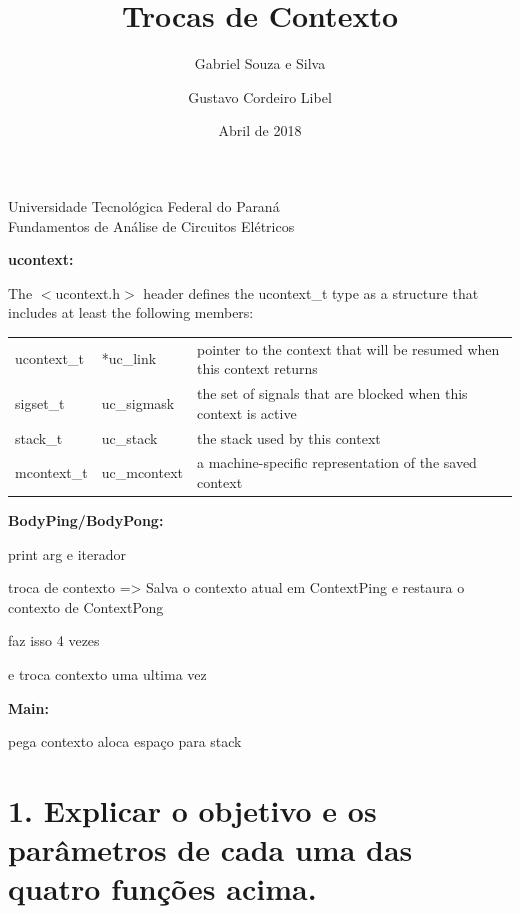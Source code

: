 \documentclass[12pt]{article}
\title{Trocas de Contexto} %
\author{Gabriel Souza e Silva \and Gustavo Cordeiro Libel} %
\date{Abril de 2018} %
\begin{document}
\maketitle %
\begin{center}
	Universidade Tecnológica Federal do Paraná\\
	Fundamentos de Análise de Circuitos Elétricos
\end{center}


\textbf{\large ucontext:}

The $<$ucontext.h$>$ header defines the ucontext\_t type as a structure that includes at least the following members:

\begin{table}[H]
	\centering
	\label{my-label}
	\begin{tabular}{|l|l|l|}
		\hline 
		ucontext\_t & *uc\_link    & pointer to the context that will be resumed when this context returns \\
		sigset\_t   & uc\_sigmask  & the set of signals that are blocked when this context is active       \\
		stack\_t    & uc\_stack    & the stack used by this context                                        \\
		mcontext\_t & uc\_mcontext & a machine-specific representation of the saved context          \\
		\hline      
	\end{tabular}
\end{table}


\textbf{\large BodyPing/BodyPong:}

print arg e iterador

troca de contexto => Salva o contexto atual em ContextPing e restaura o contexto de ContextPong

faz isso 4 vezes

e troca contexto uma ultima vez

\textbf{\large Main:}

pega contexto
aloca espaço para stack


\section*{1. Explicar o objetivo e os parâmetros de cada uma das quatro funções acima.}
\end{document}
